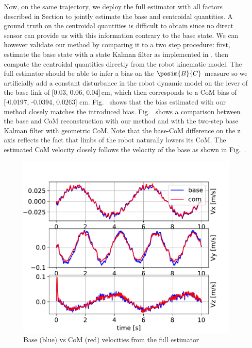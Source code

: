 Now, on the same trajectory, we deploy the full estimator with all factors described in Section  to jointly 
estimate the base and centroidal quantities. A ground truth on the centroidal quantities is difficult to obtain since no direct 
sensor can provide us with this information contrary to the base state. 
We can however validate our method by comparing it to a two step procedure: first, estimate the base state with a state Kalman filter as 
implemented in \cite{bledt2018cheetah}, then compute the centroidal quantities directly from the robot kinematic model. 
The full estimator should be able to infer a bias on the $\posim{B}{C}$ measure so we artificially add a constant disturbance 
in the robot dynamic model on the lever of the base link of [0.03, 0.06, 0.04]\,cm, which then corresponds to a CoM bias of 
[-0.0197, -0.0394,  0.0263] cm. Fig.~ shows that the bias estimated with our method closely matches the introduced bias. 
Fig.~ shows a comparison between the base and CoM reconstruction with our method and with the two-step base Kalman filter 
with geometric CoM. Note that the base-CoM difference on the z axis reflects the fact that limbs of the robot naturally lowers  its CoM. 
The estimated CoM velocity closely follows the velocity of the base as shown in Fig.~.




\begin{figure}[t]
    \centering
    \includegraphics[height=0.6\columnwidth]{figures/centroidal/com_velocity_povcdl_sin.pdf}
    \caption{Base (blue) vs CoM (red) velocities   from the full estimator}
    \label{fig:com_base_vel}
\end{figure}


